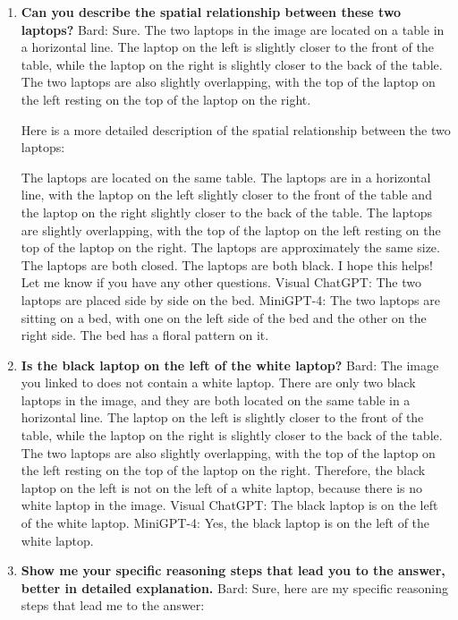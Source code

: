     \begin{enumerate}
        \item \textbf{Can you describe the spatial relationship between these two laptops?}
        \subitem Bard:
        Sure. The two laptops in the image are located on a table in a horizontal line. The laptop on the left is slightly closer to the front of the table, while the laptop on the right is slightly closer to the back of the table. The two laptops are also slightly overlapping, with the top of the laptop on the left resting on the top of the laptop on the right.

        Here is a more detailed description of the spatial relationship between the two laptops:

        The laptops are located on the same table.
        The laptops are in a horizontal line, with the laptop on the left slightly closer to the front of the table and the laptop on the right slightly closer to the back of the table.
        The laptops are slightly overlapping, with the top of the laptop on the left resting on the top of the laptop on the right.
        The laptops are approximately the same size.
        The laptops are both closed.
        The laptops are both black.
        I hope this helps! Let me know if you have any other questions.
        \subitem Visual ChatGPT: The two laptops are placed side by side on the bed.
        \subitem MiniGPT-4: The two laptops are sitting on a bed, with one on the left side of the bed and the other on the right side. The bed has a floral pattern on it.

        \item \textbf{Is the black laptop on the left of the white laptop?}
        \subitem Bard: The image you linked to does not contain a white laptop. There are only two black laptops in the image, and they are both located on the same table in a horizontal line. The laptop on the left is slightly closer to the front of the table, while the laptop on the right is slightly closer to the back of the table. The two laptops are also slightly overlapping, with the top of the laptop on the left resting on the top of the laptop on the right.
        Therefore, the black laptop on the left is not on the left of a white laptop, because there is no white laptop in the image.
        \subitem Visual ChatGPT: The black laptop is on the left of the white laptop.
        \subitem MiniGPT-4: Yes, the black laptop is on the left of the white laptop.
        \item \textbf{Show me your specific reasoning steps that lead you to the answer, better in detailed explanation.}
        \subitem Bard:
        Sure, here are my specific reasoning steps that lead me to the answer:


\end{enumerate}

